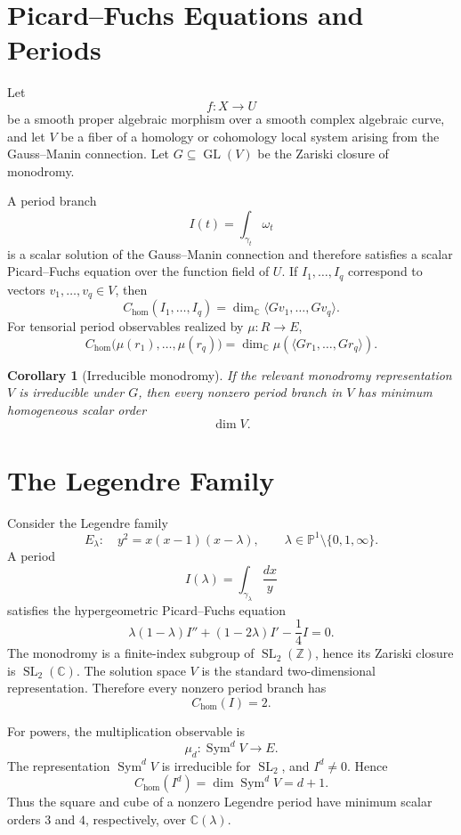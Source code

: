\documentclass[11pt]{article}
\newtheorem{corollary}[theorem]{Corollary}
\DeclareMathOperator{\Sym}{Sym}
\begin{document}
\section{Picard--Fuchs Equations and Periods}

Let
\[
f:X\to U
\]
be a smooth proper algebraic morphism over a smooth complex algebraic curve, and let \(V\) be a fiber of a homology or cohomology local system arising from the Gauss--Manin connection. Let \(G\subseteq\operatorname{GL}(V)\) be the Zariski closure of monodromy.

A period branch
\[
I(t)=\int_{\gamma_t}\omega_t
\]
is a scalar solution of the Gauss--Manin connection and therefore satisfies a scalar Picard--Fuchs equation over the function field of \(U\). If \(I_1,\ldots,I_q\) correspond to vectors \(v_1,\ldots,v_q\in V\), then
\[
C_{\mathrm{hom}}(I_1,\ldots,I_q)
=
\dim_\mathbb C\langle Gv_1,\ldots,Gv_q\rangle.
\]
For tensorial period observables realized by \(\mu:R\to E\),
\[
C_{\mathrm{hom}}\bigl(\mu(r_1),\ldots,\mu(r_q)\bigr)
=
\dim_\mathbb C\mu(\langle G r_1,\ldots,G r_q\rangle).
\]

\begin{corollary}[Irreducible monodromy]
If the relevant monodromy representation \(V\) is irreducible under \(G\), then every nonzero period branch in \(V\) has minimum homogeneous scalar order
\[
\dim V.
\]
\end{corollary}

\section{The Legendre Family}

Consider the Legendre family
\[
E_\lambda:\quad y^2=x(x-1)(x-\lambda),
\qquad
\lambda\in\mathbb P^1\setminus\{0,1,\infty\}.
\]
A period
\[
I(\lambda)=\int_{\gamma_\lambda}\frac{dx}{y}
\]
satisfies the hypergeometric Picard--Fuchs equation
\[
\lambda(1-\lambda)I''
+(1-2\lambda)I'
-\frac14 I=0.
\]
The monodromy is a finite-index subgroup of \(\operatorname{SL}_2(\mathbb Z)\), hence its Zariski closure is \(\operatorname{SL}_2(\mathbb C)\). The solution space \(V\) is the standard two-dimensional representation. Therefore every nonzero period branch has
\[
C_{\mathrm{hom}}(I)=2.
\]

For powers, the multiplication observable is
\[
\mu_d:\Sym^d V\to E.
\]
The representation \(\Sym^d V\) is irreducible for \(\operatorname{SL}_2\), and \(I^d\ne0\). Hence
\[
C_{\mathrm{hom}}(I^d)=\dim\Sym^d V=d+1.
\]
Thus the square and cube of a nonzero Legendre period have minimum scalar orders \(3\) and \(4\), respectively, over \(\mathbb C(\lambda)\).
\end{document}
